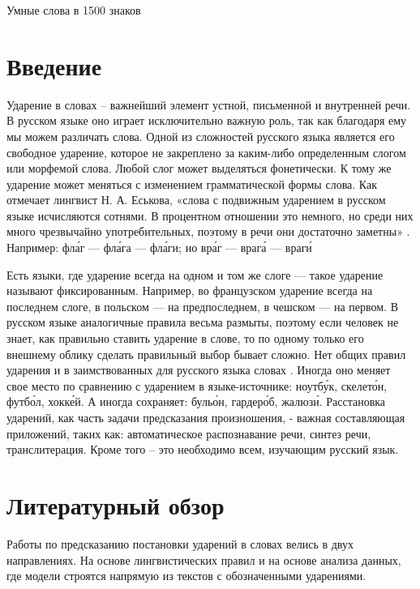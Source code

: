 \documentclass[14pt, a4paper, russian]{extreport}
\begin{document}
Умные слова в 1500 знаков


\tableofcontents{}


\chapter*{Введение}
Ударение в словах – важнейший элемент устной, письменной и внутренней речи. В русском языке оно играет исключительно важную роль, так как благодаря ему мы можем различать слова. Одной из сложностей русского языка является его свободное ударение, которое не закреплено за каким-либо определенным слогом или морфемой слова. Любой слог может выделяться фонетически. К тому же ударение  может меняться с изменением грамматической формы слова. Как отмечает лингвист Н. А. Еськова, «слова с подвижным ударением в русском языке исчисляются сотнями. В процентном отношении это немного, но среди них много чрезвычайно употребительных, поэтому в речи они достаточно заметны» \cite{eskina}. Например: фл\'{а}г — фл\'{а}га — фл\'{а}ги; но вр\'{а}г — враг\'{а} — враг\'{и} 

Есть языки, где ударение  всегда на одном и том же слоге — такое ударение называют фиксированным. Например, во французском ударение всегда на последнем слоге, в польском — на предпоследнем, в чешском — на первом. В русском языке аналогичные правила весьма размыты, поэтому если человек не знает, как правильно ставить ударение в слове, то по одному только его внешнему облику сделать правильный выбор бывает сложно.  Нет общих правил ударения и в заимствованных для русского языка словах . Иногда оно меняет свое место по сравнению с ударением в языке-источнике: ноутб\'{у}к, скелет\'{о}н, футб\'{о}л, хокк\'{е}й. А иногда сохраняет: буль\'{о}н, гардер\'{о}б, жалюз\'{и}.
Расстановка ударений, как часть задачи предсказания произношения, - важная составляющая  приложений, таких как: автоматическое распознавание речи, синтез речи, транслитерация. Кроме того – это необходимо всем, изучающим русский язык.


\newpage

\chapter{Литературный обзор}

Работы по предсказанию постановки ударений в словах велись в двух направлениях. На основе лингвистических правил \cite{church, williams} и на основе анализа данных, где модели строятся напрямую из текстов с обозначенными ударениями. 
\end{document}

